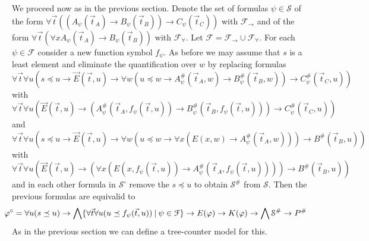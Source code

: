 \documentclass[a4paper,UKenglish,cleveref, autoref, thm-restate]{lipics-v2021}
\begin{document}
We proceed now as in the previous section. Denote the set of formulas $\psi\in\mathcal S$ of the form $\forall\vec t((A_\psi(\vec t_A)\to B_\psi(\vec t_B))\to C_\psi(\vec t_C))$ with $\mathcal F_\to$ and of the form $\forall \vec t(\forall xA_\psi(\vec t_A)\to B_\psi(\vec t_B))$ with $\mathcal F_\forall$. Let $\mathcal F = \mathcal F_\to\cup\mathcal F_\forall$. For each  $\psi\in\mathcal F$ consider a new function symbol $f_\psi$. As before we may assume that $s$ is a least element and eliminate the quantification over $w$ by replacing formulas
$$\forall \vec t\forall u(s\preceq u\to\vec E(\vec t, u)\to \forall w(u\preceq w\to A_\psi^\#(\vec t_A, w)\to B_\psi^\#(\vec t_B, w))\to C_\psi^\#(\vec t_C, u))$$ with
$$\forall \vec t\forall u(\vec E(\vec t, u)\to (A_\psi^\#(\vec t_A, f_\psi(\vec t, u))\to B_\psi^\#(\vec t_B, f_\psi(\vec t, u)))\to C_\psi^\#(\vec t_C, u))$$ and
$$\forall \vec t\forall u(s\preceq u\to\vec E(\vec t, u)\to \forall w(u\preceq w\to \forall x(E(x, w)\to A_\psi^\#(\vec t_A, w)))\to B^\#(\vec t_B, u))$$ with $$\forall \vec t\forall u(\vec E(\vec t, u)\to (\forall x(E(x, f_\psi(\vec t, u))\to A_\psi^\#(\vec t_A, f_\psi(\vec t, u))))\to B^\#(\vec t_B, u))$$
and in each other formula in $\mathcal S^\circ$ remove the $s\preceq u$ to obtain $\mathcal S^\#$ from $\mathcal S$. Then the previous formulas are equivalid to
$$\hspace*{-.5cm}\varphi^\circ= \forall u(s\preceq u)\to \bigwedge\{\forall \vec t\forall u(u\preceq f_\psi(\vec t, u))\:|\:\psi\in\mathcal F\}\to E(\varphi)\to K(\varphi)\to\bigwedge\mathcal S^\#\to P^\#$$
As in the previous section we can define a tree-counter model for this.
\end{document}
